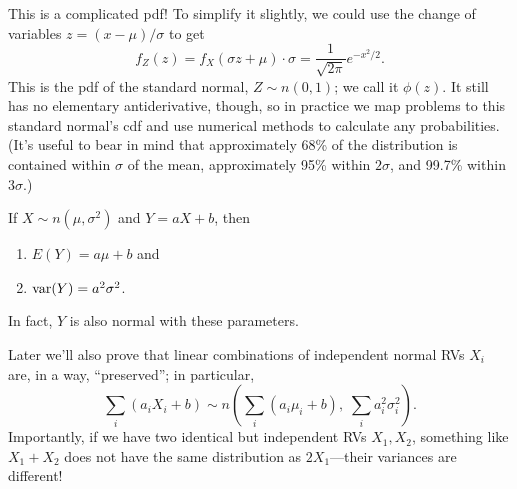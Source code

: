 \documentclass[../m157main.tex]{subfiles}
\begin{document}
This is a complicated pdf!
To simplify it slightly, we could use the change of variables $z = (x - \mu) / \sigma$ to get
\[ f_Z(z) = f_X(\sigma z + \mu) \cdot \sigma = \frac{1}{\sqrt{2\pi}} e^{-x^2 / 2}. \]
This is the pdf of the standard normal, $Z \sim n(0,1)$; we call it $\phi(z)$.
It still has no elementary antiderivative, though, so in practice we map problems to this standard normal's cdf and use numerical methods to calculate any probabilities.
(It's useful to bear in mind that approximately 68\% of the distribution is contained within $\sigma$ of the mean, approximately 95\% within $2\sigma$, and 99.7\% within $3\sigma$.)   %

\begin{theorem}
    If $X \sim n(\mu, \sigma^2)$ and $Y = aX + b$, then
    \begin{enumerate}[label=(\alph*)]
        \item $E(Y) = a\mu + b$ and
        \item $\operatorname{var}(Y) = a^2 \sigma^2$.
    \end{enumerate}
    In fact, $Y$ is also normal with these parameters.
\end{theorem}

Later we'll also prove that linear combinations of independent normal RVs $X_i$ are, in a way, ``preserved''; in particular,
\[ \sum_{i}^{} (a_i X_i + b) \sim n \left( \sum_{i}^{} (a_i \mu_i + b), \; \sum_{i}^{} a_i^2 \sigma_i^2 \right). \]
Importantly, if we have two identical but independent RVs $X_1, X_2$, something like $X_1 + X_2$ does not have the same distribution as $2X_1$---their variances are different!
\end{document}
